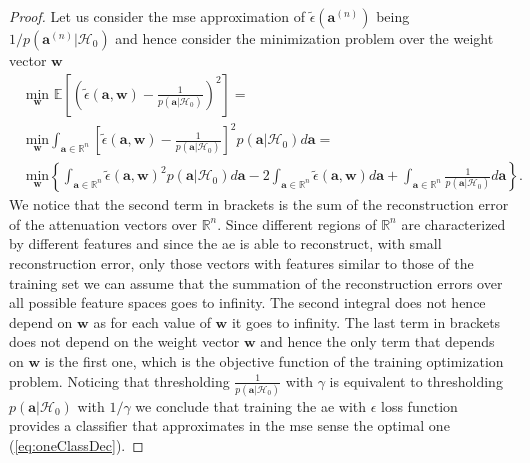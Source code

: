 \documentclass[draftcls,onecolumn,12pt]{IEEEtran}
\newcommand{\Exp}[1]{\mathbb{E}\left[#1\right]}
\begin{document}
\begin{proof}
Let us consider the \ac{mse} approximation of $\tilde{\epsilon}(\bm{a}^{(n)})$ being $1/p(\bm{a}^{(n)}|\mathcal{H}_0)$ and hence consider the minimization problem over the weight vector $\bm{w}$
\begin{equation}
	\begin{aligned}
		&\underset{\mathbf{w}}{\text{min}}\,\, \Exp{ \left( \tilde{\epsilon}(\mathbf{a},\mathbf{w}) - \frac{1}{p(\mathbf{a}|\mathcal{H}_0)}\right) ^2} = \\
		&\underset{\mathbf{w}}{\text{min}} \int_{\bm{a} \in \mathbb{R}^n} \left[ \tilde{\epsilon}(\mathbf{a},\mathbf{w}) - \frac{1}{p(\mathbf{a}|\mathcal{H}_0)} \right] ^2 p(\mathbf{a}|\mathcal{H}_0) d\mathbf{a} = \\
		&\underset{\mathbf{w}}{\text{min}} \left\lbrace \int_{\bm{a} \in \mathbb{R}^n} \tilde{\epsilon}(\mathbf{a},\mathbf{w})^2 p(\mathbf{a}|\mathcal{H}_0) d\mathbf{a}
		-2\int_{\bm{a} \in \mathbb{R}^n} \tilde{\epsilon}(\mathbf{a},\mathbf{w}) d\mathbf{a}
		+ \int_{\bm{a} \in \mathbb{R}^n} \frac{1}{p(\mathbf{a}|\mathcal{H}_0)} d\mathbf{a} \right\rbrace.
	\end{aligned}	
\end{equation}
We notice that the second term in brackets is the sum of the reconstruction error of the attenuation vectors over $\mathbb{R}^{n}$. Since different regions of $\mathbb{R}^n$ are characterized by different features and since the \ac{ae} is able to reconstruct, with small reconstruction error, only those vectors with features similar to those of the training set we can assume that the summation of the reconstruction errors over all possible feature spaces goes to infinity. The second integral does not hence depend on $\bm{w}$ as for each value of $\bm{w}$ it goes to infinity. The last term in brackets does not depend on the weight vector $\bm{w}$ and hence the only term that depends on $\bm{w}$ is the first one, which is the objective function of the training optimization problem. Noticing that thresholding $\frac{1}{p(\mathbf{a}|\mathcal{H}_0)}$ with $\gamma$ is equivalent to thresholding $p(\mathbf{a}|\mathcal{H}_0)$ with $1/\gamma$ we conclude that training the \ac{ae} with $\epsilon$ loss function provides a classifier that approximates in the \ac{mse} sense the optimal one (\ref{eq:oneClassDec}).
\end{proof}
\end{document}
